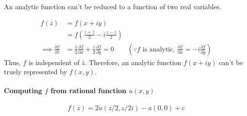 \begin{commentary}
\begin{remark}
	An analytic function can't be reduced to a function of two real variables.
\end{remark}
\begin{align*}
	f(z) 
	& = f(x+iy) \\
	& = f\left(\frac{z+\bar{z}}{2}-i\frac{z-\bar{z}}{2}\right) \\
	\implies \frac{\partial f}{\partial \bar{z}} 
	& = \frac{1}{2}\frac{\partial f}{\partial x} + \frac{i}{2}\frac{\partial f}{\partial y} = 0 \qquad \left(\because f \text{ is analytic, }\frac{\partial f}{\partial x} = -i\frac{\partial f}{\partial y}\right)
\end{align*}
Thus, $f$ is independent of $\bar{z}$.	
Therefore, an analytic function $f(x+iy)$ can't be truely represented by $f(x,y)$.
\end{commentary}

\paragraph{Computing $f$ from rational function $u(x,y)$}
\begin{equation}
	f(z) = 2u(z/2,z/2i)-u(0,0)+c
\end{equation}
